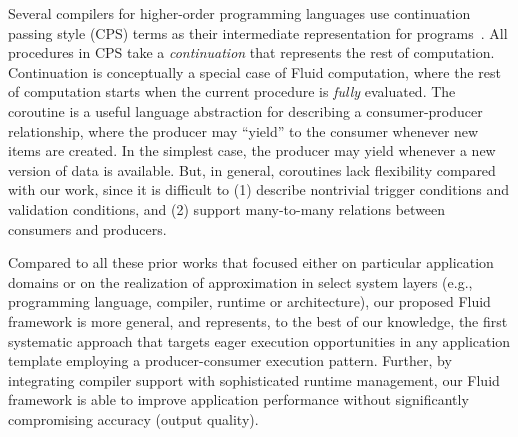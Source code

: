  Several compilers for higher-order programming languages use continuation passing style (CPS) terms as their intermediate representation for programs~\cite{appel2007compiling}.  All procedures in CPS take a \emph{continuation} that represents the rest of computation. Continuation is conceptually a special case of Fluid computation, where the rest of computation starts when the current procedure is \emph{fully} evaluated. The coroutine is a useful language abstraction for describing a consumer-producer relationship, where the producer may ``yield'' to the consumer whenever new items are created. In the simplest case, the producer may yield whenever a new version of data is available. But, in general, coroutines lack flexibility compared with our work, since it is difficult to (1) describe nontrivial trigger conditions and validation conditions, and (2) support many-to-many relations between consumers and producers.

 Compared to all these prior works that focused either on particular application domains or on the realization of approximation in select system layers (e.g., programming language, compiler, runtime or architecture), our proposed Fluid framework is more general, and represents, to the best of our knowledge, the first systematic approach that targets eager execution opportunities in any application template employing a producer-consumer execution pattern. Further, by integrating compiler support with sophisticated runtime management, our Fluid framework is able to improve application performance without significantly compromising accuracy (output quality).




